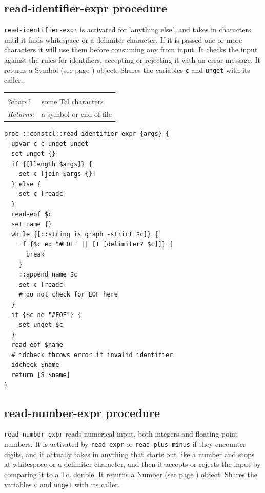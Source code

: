 \documentclass[twoside,9pt]{report}
\begin{document}
\subsection{read-identifier-expr procedure}
\label{read-identifier-expr-procedure}


\texttt{read-identifier-expr} is activated for 'anything else', and takes in characters until it finds whitespace or a delimiter character. If it is passed one or more characters it will use them before consuming any from input. It checks the input against the rules for identifiers, accepting or rejecting it with an error message. It returns a Symbol (see page \pageref{symbols}) object. Shares the variables \texttt{c} and \texttt{unget} with its caller.

\noindent\begin{tabular}{ |p{1.9cm} p{8cm}| }
\hline
\rowcolor[HTML]{CCCCCC} \multicolumn{2}{|l|}{\bf read-identifier-expr (internal)} \\
?chars? & some Tcl characters \\
\textit{Returns:} & a symbol or end of file \\
\hline
\end{tabular}
\begin{lstlisting}
proc ::constcl::read-identifier-expr {args} {
  upvar c c unget unget
  set unget {}
  if {[llength $args]} {
    set c [join $args {}]
  } else {
    set c [readc]
  }
  read-eof $c
  set name {}
  while {[::string is graph -strict $c]} {
    if {$c eq "#EOF" || [T [delimiter? $c]]} {
      break
    }
    ::append name $c
    set c [readc]
    # do not check for EOF here
  }
  if {$c ne "#EOF"} {
    set unget $c
  }
  read-eof $name
  # idcheck throws error if invalid identifier
  idcheck $name
  return [S $name]
}
\end{lstlisting}
\subsection{read-number-expr procedure}
\label{read-number-expr-procedure}


\texttt{read-number-expr} reads numerical input, both integers and floating point numbers. It is activated by \texttt{read-expr} or \texttt{read-plus-minus} if they encounter digits, and it actually takes in anything that starts out like a number and stops at whitespace or a delimiter character, and then it accepts or rejects the input by comparing it to a Tcl double. It returns a Number (see page \pageref{numbers}) object. Shares the variables \texttt{c} and \texttt{unget} with its caller.
\end{document}
